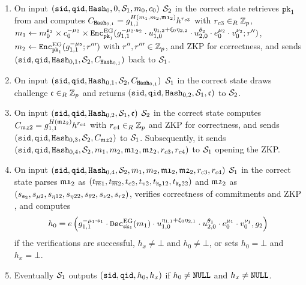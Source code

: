 \begin{enumerate}
	    \item On input $(\mathtt{sid},\mathtt{qid},\mathtt{Hash}_0,0,\mathcal{S}_1,m_0,c_0)$ $\mathcal{S}_2$ in the correct state retrieves $\mathtt{pk}_1$ from \Fca and computes
	      $C_{\mathtt{Hash}_{0,1}}=g_{1,1}^{H(m_{1},m_{2},\mathfrak{m1}_2)} h^{r_{c3}}$
	      with $r_{c3}\in_R\mathbb{Z}_p$,
	      $m_{1}\gets m_0^{\share_2} \times c_0^{-\mu_2} \times \Enc_{\pk_1}^\EG(g_{1,1}^{-\mu_2\cdot {\share_2}} \cdot u_{1,0}^{\eta_{1,2}+\xi_0\eta_{2,2}} \cdot u_{2,0}^{\theta_2} \cdot e_0^{\mu_2} \cdot v_0^{\nu_2}; r'')$, $m_{2}\gets \mathtt{Enc}_{\mathtt{pk}_1}^\mathrm{EG}(g_{1,1}^{-\mu_2}; r''')$ with $r'',r'''\in\mathbb{Z}_p$, and \ac{ZKP} for correctness,
	      and sends $(\mathtt{sid},\mathtt{qid},\mathtt{Hash}_{0,1},\mathcal{S}_2,C_{\mathtt{Hash}_{0,1}})$ back to $\mathcal{S}_1$.
	      
	    \item On input $(\mathtt{sid},\mathtt{qid},\mathtt{Hash}_{0,1},\mathcal{S}_2,C_{\mathtt{Hash}_{0,1}})$ $\mathcal{S}_1$ in the correct state draws challenge $\mathfrak{c}\in_R\mathbb{Z}_p$ and returns $(\mathtt{sid},\mathtt{qid},\mathtt{Hash}_{0,2},\mathcal{S}_1,\mathfrak{c})$ to $\mathcal{S}_2$. 
	    
	    \item On input $(\mathtt{sid},\mathtt{qid},\mathtt{Hash}_{0,2},\mathcal{S}_1,\mathfrak{c})$ $\mathcal{S}_2$ in the correct state computes
	    $C_{\mathfrak{m2}2}=g_{1,1}^{H(\mathfrak{m2}_{2})} h^{r_{c4}}$ with $r_{c4}\in_R\mathbb{Z}_p$ and \ac{ZKP} for correctness,
	    and sends $(\mathtt{sid},\mathtt{qid},\mathtt{Hash}_{0,3},\mathcal{S}_2,C_{\mathfrak{m2}2})$ to $\mathcal{S}_1$.
	    Subsequently, it sends $(\mathtt{sid},\mathtt{qid},\mathtt{Hash}_{0,4},\mathcal{S}_2, m_1, m_2, \mathfrak{m1}_2, \mathfrak{m2}_2, r_{c3}, r_{c4})$ to $\mathcal{S}_1$ opening the \ac{ZKP}.
	    
	    \item On input $(\mathtt{sid},\mathtt{qid},\mathtt{Hash}_{0,4},\mathcal{S}_2, m_1, m_2, \mathfrak{m1}_2, \mathfrak{m2}_2, r_{c3}, r_{c4})$ $\mathcal{S}_1$ in the correct state parses $\mathfrak{m1}_{2}$ as $(t_{\overline{m}1}, t_{\overline{m}2}, t_{e2}, t_{v2}, t_{\mathtt{k_p}12}, t_{\mathtt{k_p}22})$ and $\mathfrak{m2}_{2}$ as $(s_{\mathfrak{s}_2}, s_{\mu2}, s_{\eta12}, s_{\eta22}, s_{\theta2}, s_{\nu2}, s_{r2})$, verifies correctness of commitments and \ac{ZKP} , and computes
	      \[h_0 = e\left( g_{1,1}^{-\mu_1\cdot \mathfrak{s}_1} \cdot \mathtt{Dec}_{\mathtt{sk}_1}^\mathrm{EG}(m_1) \cdot u_{1,0}^{\eta_{1,1}+\xi_0\eta_{2,1}} \cdot u_{2,0}^{\theta_1} \cdot e_0^{\mu_1} \cdot v_0^{\nu_1}, g_2 \right)\] 
	      if the verifications are successful, $h_x\not=\bot$ and $h_0\not=\bot$, or sets $h_0=\bot$ and $h_x=\bot$.
	    
	    \item Eventually $\mathcal{S}_1$ outputs $(\mathtt{sid}, \mathtt{qid}, h_0, h_x)$ if $h_0\not=\mathtt{NULL}$ and $h_x\not=\mathtt{NULL}$.
	  \end{enumerate}
	  	
